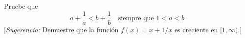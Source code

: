 \item Pruebe que 
    $$a + \frac{1}{a} < b + \frac{1}{b} \quad \text{siempre que } 1 < a < b$$
    {[}\textit{Sugerencia:} Demuestre que la función $f(x) = x + 1/x$ es creciente en $[1, \infty)$.{]}
